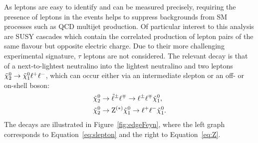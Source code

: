 As leptons are easy to identify and can be measured precisely, requiring the presence of leptons in the events helps to suppress backgrounds from SM processes such as QCD multijet production. Of particular interest to this analysis are SUSY cascades which contain the correlated production of lepton pairs of the same flavour but opposite electric charge. Due to their more challenging experimental signature, $\tau$ leptons are not considered. The relevant decay is that of a next-to-lightest neutralino into the lightest neutralino and two leptons ${\tilde{\chi}^0_2} \rightarrow {\tilde{\chi}^0_1} \ell^+\ell^-$, which can occur either via an intermediate slepton or an off- or on-shell \Z boson:
\begin{align}
{\tilde{\chi}^0_2} &\rightarrow \tilde{\ell}^{\pm}\ell^{\mp} \rightarrow \ell^{\pm}\ell^{\mp}{\tilde{\chi}^0_1},\label{eq:slepton}\\ 
{\tilde{\chi}^0_2} &\rightarrow \mathrm{Z}^{(*)}{\tilde{\chi}^0_1} \rightarrow \ell^+\ell^-{\tilde{\chi}^0_1}.\label{eq:Z}
\end{align}
The decays are illustrated in Figure~\ref{fig:edgeFeyn}, where the left graph corresponds to Equation~\ref{eq:slepton} and the right to Equation~\ref{eq:Z}.
